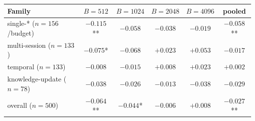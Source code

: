 \begin{tabular}{lccccc}
\toprule
Family & $B{=}512$ & $B{=}1024$ & $B{=}2048$ & $B{=}4096$ & pooled \\
\midrule
single-* ($n{=}156$/budget) & $-0.115$** & $-0.058$ & $-0.038$ & $-0.019$ & $-0.058$** \\
multi-session ($n{=}133$) & $-0.075$* & $-0.068$ & $+0.023$ & $+0.053$ & $-0.017$ \\
temporal ($n{=}133$) & $-0.008$ & $-0.015$ & $+0.008$ & $+0.023$ & $+0.002$ \\
knowledge-update ($n{=}78$) & $-0.038$ & $-0.026$ & $-0.013$ & $-0.038$ & $-0.029$ \\
overall ($n{=}500$) & $-0.064$** & $-0.044$* & $-0.006$ & $+0.008$ & $-0.027$** \\
\bottomrule
\end{tabular}
